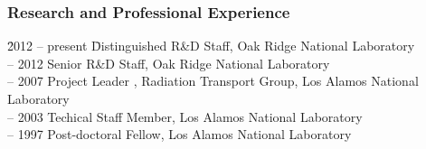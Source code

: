 \subsubsection*{Research and Professional Experience}
\vspace*{-1ex}
\begin{tabbing}
  \hspace*{1ex} 
  \= 2012 -- present \hspace*{2ex} \= Distinguished R\&D Staff, Oak Ridge National
  Laboratory\\ 
   -- 2012 \> Senior R\&D Staff, Oak Ridge National Laboratory\\
   -- 2007 \>  Project Leader , Radiation Transport Group,
  Los Alamos National Laboratory\\
   -- 2003 \> Techical Staff Member, Los Alamos National Laboratory\\
   -- 1997 \> Post-doctoral Fellow, Los Alamos National Laboratory
\end{tabbing}


\vspace*{-3ex}
